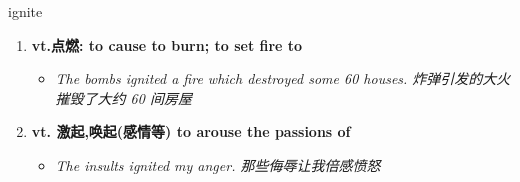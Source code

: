 
\begin{frame}
{\huge ignite}
\begin{center}
\begin{enumerate}\Large
  \item \textbf{vt.点燃: to cause to burn; to set fire to}
  \begin{itemize}
    \item \em{\Large{The bombs ignited a fire which destroyed some 60 houses. 炸弹引发的大火摧毁了大约 60 间房屋}}
  \end{itemize}
  \item \textbf{vt. 激起,唤起(感情等) to arouse the passions of}
  \begin{itemize}
    \item \em{\Large{The insults ignited my anger. 那些侮辱让我倍感愤怒}}
  \end{itemize}
\end{enumerate}
\end{center}
\end{frame}
